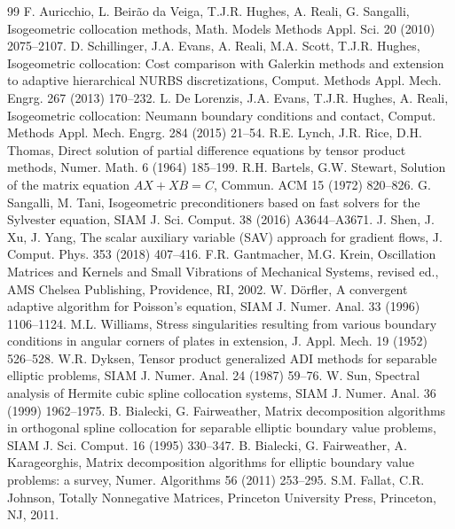 \documentclass[preprint,12pt]{elsarticle}
\theoremstyle{remark}
\begin{document}
\begin{thebibliography}{99}
 F. Auricchio, L. Beir\~ao da Veiga, T.J.R. Hughes, A. Reali, G. Sangalli, Isogeometric collocation methods, Math. Models Methods Appl. Sci. 20 (2010) 2075--2107.
 D. Schillinger, J.A. Evans, A. Reali, M.A. Scott, T.J.R. Hughes, Isogeometric collocation: Cost comparison with Galerkin methods and extension to adaptive hierarchical NURBS discretizations, Comput. Methods Appl. Mech. Engrg. 267 (2013) 170--232.
 L. De Lorenzis, J.A. Evans, T.J.R. Hughes, A. Reali, Isogeometric collocation: Neumann boundary conditions and contact, Comput. Methods Appl. Mech. Engrg. 284 (2015) 21--54.
 R.E. Lynch, J.R. Rice, D.H. Thomas, Direct solution of partial difference equations by tensor product methods, Numer. Math. 6 (1964) 185--199.
 R.H. Bartels, G.W. Stewart, Solution of the matrix equation $AX+XB=C$, Commun. ACM 15 (1972) 820--826.
 G. Sangalli, M. Tani, Isogeometric preconditioners based on fast solvers for the Sylvester equation, SIAM J. Sci. Comput. 38 (2016) A3644--A3671.
 J. Shen, J. Xu, J. Yang, The scalar auxiliary variable (SAV) approach for gradient flows, J. Comput. Phys. 353 (2018) 407--416.
 F.R. Gantmacher, M.G. Krein, Oscillation Matrices and Kernels and Small Vibrations of Mechanical Systems, revised ed., AMS Chelsea Publishing, Providence, RI, 2002.
 W. D\"orfler, A convergent adaptive algorithm for Poisson's equation, SIAM J. Numer. Anal. 33 (1996) 1106--1124.
 M.L. Williams, Stress singularities resulting from various boundary conditions in angular corners of plates in extension, J. Appl. Mech. 19 (1952) 526--528.
 W.R. Dyksen, Tensor product generalized ADI methods for separable elliptic problems, SIAM J. Numer. Anal. 24 (1987) 59--76.
 W. Sun, Spectral analysis of Hermite cubic spline collocation systems, SIAM J. Numer. Anal. 36 (1999) 1962--1975.
 B. Bialecki, G. Fairweather, Matrix decomposition algorithms in orthogonal spline collocation for separable elliptic boundary value problems, SIAM J. Sci. Comput. 16 (1995) 330--347.
 B. Bialecki, G. Fairweather, A. Karageorghis, Matrix decomposition algorithms for elliptic boundary value problems: a survey, Numer. Algorithms 56 (2011) 253--295.
 S.M. Fallat, C.R. Johnson, Totally Nonnegative Matrices, Princeton University Press, Princeton, NJ, 2011.
\end{thebibliography}
\end{document}
